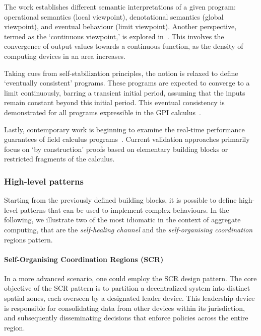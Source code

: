 The work establishes different semantic interpretations of a given program: 
 operational semantics (local viewpoint), denotational semantics (global viewpoint), and eventual behaviour (limit viewpoint). 
 Another perspective, termed as the `continuous viewpoint,' is explored in~\cite{beal2017self}. 
 This involves the convergence of output values towards a continuous function, 
 as the density of computing devices in an area increases.

Taking cues from self-stabilization principles, 
 the notion is relaxed to define `eventually consistent' programs. 
 These programs are expected to converge to a limit continuously, 
 barring a transient initial period, assuming that the inputs remain constant beyond this initial period. This eventual consistency is demonstrated for all programs expressible in the GPI calculus~\cite{audrito2018space}.

Lastly, 
 contemporary work is beginning to examine the real-time performance guarantees of field calculus programs~\cite{audrito2018space}. 
 Current validation approaches primarily focus on `by construction' proofs based on elementary building blocks or restricted fragments of the calculus. 
\subsubsection{High-level patterns}\label{sec:field-calculus-high-level-patterns}
Starting from the previously defined building blocks, 
 it is possible to define high-level patterns that can be used to implement complex behaviours.
 In the following, we illustrate two of the most idiomatic in the context of aggregate computing, that are 
 the \emph{self-healing channel} and the \emph{self-organising coordination} regions pattern.
\paragraph*{Self-Organising Coordination Regions (SCR)}
In a more advanced scenario, 
 one could employ the SCR design pattern. 
 The core objective of the SCR pattern is to partition a decentralized system into distinct spatial zones, each overseen by a designated leader device. 
 This leadership device is responsible for consolidating data from other devices within its jurisdiction,
 and subsequently disseminating decisions that enforce policies across the entire region.


